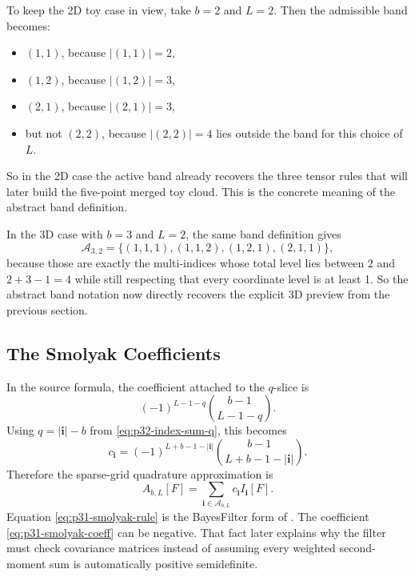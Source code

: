 \documentclass[11pt]{article}
\numberwithin{equation}{section}
\begin{document}
To keep the 2D toy case in view, take \(b=2\) and \(L=2\).  Then the admissible
band becomes:
\begin{itemize}[leftmargin=0.28in]
  \item \((1,1)\), because \(|(1,1)|=2\),
  \item \((1,2)\), because \(|(1,2)|=3\),
  \item \((2,1)\), because \(|(2,1)|=3\),
  \item but not \((2,2)\), because \(|(2,2)|=4\) lies outside the band for this
  choice of \(L\).
\end{itemize}
So in the 2D case the active band already recovers the three tensor rules that
will later build the five-point merged toy cloud.  This is the concrete meaning
of the abstract band definition.

In the 3D case with \(b=3\) and \(L=2\), the same band definition gives
\begin{equation}
  \mathcal A_{3,2}
  =
  \{(1,1,1),(1,1,2),(1,2,1),(2,1,1)\},
  \label{eq:p38-A32}
\end{equation}
because those are exactly the multi-indices whose total level lies between
\(2\) and \(2+3-1=4\) while still respecting that every coordinate level is at
least 1.  So the abstract band notation now directly recovers the explicit 3D
preview from the previous section.

\subsection{The Smolyak Coefficients}
\label{subsec:p32-smolyak-coefficients}

In the source formula, the coefficient attached to the \(q\)-slice is
\[
  (-1)^{L-1-q}\binom{b-1}{L-1-q}.
\]
Using \(q=|\mathbf i|-b\) from \eqref{eq:p32-index-sum-q}, this becomes
\begin{equation}
  c_{\mathbf i}
  =
  (-1)^{L+b-1-|\mathbf i|}
  \binom{b-1}{L+b-1-|\mathbf i|}.
  \label{eq:p31-smolyak-coeff}
\end{equation}
Therefore the sparse-grid quadrature approximation is
\begin{equation}
  A_{b,L}[F]
  =
  \sum_{\mathbf i\in\mathcal A_{b,L}}
  c_{\mathbf i}I_{\mathbf i}[F].
  \label{eq:p31-smolyak-rule}
\end{equation}
Equation \eqref{eq:p31-smolyak-rule} is the BayesFilter form of
\citet[Eq. 26--29]{jia2012sparsegrid}.  The coefficient
\eqref{eq:p31-smolyak-coeff} can be negative.  That fact later explains why
the filter must check covariance matrices instead of assuming every weighted
second-moment sum is automatically positive semidefinite.
\end{document}
